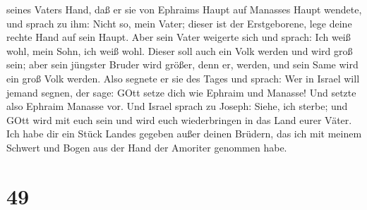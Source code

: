 seines Vaters Hand, daß er sie von Ephraims Haupt auf Manasses Haupt
wendete,  und sprach zu ihm: Nicht so, mein Vater; dieser
ist der Erstgeborene, lege deine rechte Hand auf sein Haupt.
 Aber sein Vater weigerte sich und sprach: Ich weiß wohl,
mein Sohn, ich weiß wohl. Dieser soll auch ein Volk werden und wird groß
sein; aber sein jüngster Bruder wird größer, denn er, werden, und sein
Same wird ein groß Volk werden.  Also segnete er sie des
Tages und sprach: Wer in Israel will jemand segnen, der sage: GOtt setze
dich wie Ephraim und Manasse! Und setzte also Ephraim Manasse vor.
 Und Israel sprach zu Joseph: Siehe, ich sterbe; und GOtt
wird mit euch sein und wird euch wiederbringen in das Land eurer Väter.
 Ich habe dir ein Stück Landes gegeben außer deinen
Brüdern, das ich mit meinem Schwert und Bogen aus der Hand der Amoriter
genommen habe.

\hypertarget{section-48}{%
\section{49}\label{section-48}}

